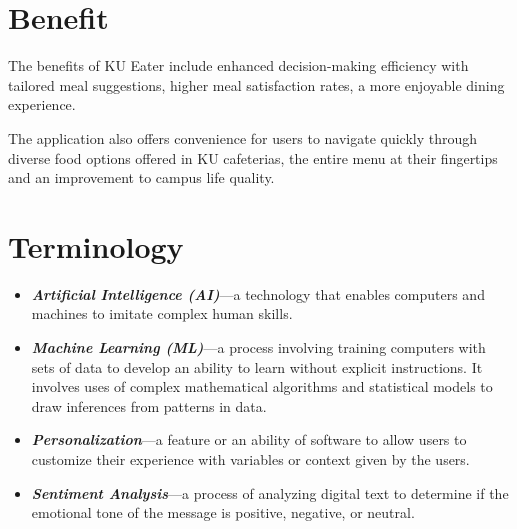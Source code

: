 \newpage

\section{Benefit}
\label{section:benefit}

The benefits of KU Eater include enhanced decision-making efficiency with tailored meal suggestions,
higher meal satisfaction rates, a more enjoyable dining experience.

The application also offers convenience for users to navigate quickly through diverse food options offered in KU cafeterias,
the entire menu at their fingertips and an improvement to campus life quality.

\section{Terminology}
\label{section:terminology}

\begin{itemize}[leftmargin=40pt]
    \item \textbf{\textit{Artificial Intelligence (AI)}}---a technology that enables computers and machines to imitate complex human skills.
    \item \textbf{\textit{Machine Learning (ML)}}---a process involving training computers with sets of data to develop an ability to learn without explicit instructions. It involves uses of complex mathematical algorithms and statistical models to draw inferences from patterns in data.
    \item \textbf{\textit{Personalization}}---a feature or an ability of software to allow users to customize their experience with variables or context given by the users.
    \item \textbf{\textit{Sentiment Analysis}}---a process of analyzing digital text to determine if the emotional tone of the message is positive, negative, or neutral.
\end{itemize}
